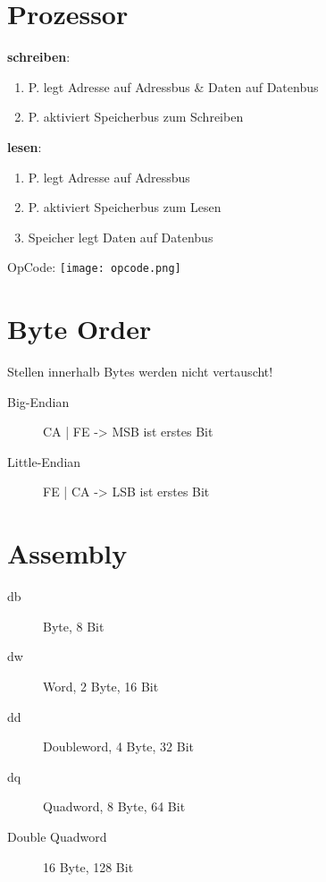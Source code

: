 

\newcommand{\TITLE}{Betriebssysteme 1}
\newcommand{\AUTHOR}{Mona Panchaud}
\newcommand{\INSTITUTE}{Ostschweizer Fachhochschule}

\begin{multicols*}{4}

\section{Prozessor}
\textbf{schreiben}:
\begin{enumerate}
    \item P. legt Adresse auf Adressbus \& Daten auf Datenbus
    \item P. aktiviert Speicherbus zum Schreiben
\end{enumerate}
\textbf{lesen}:
\begin{enumerate}
    \item P. legt Adresse auf Adressbus
    \item P. aktiviert Speicherbus zum Lesen
    \item Speicher legt Daten auf Datenbus
\end{enumerate}
OpCode: \texttt{[image: opcode.png]}

\section{Byte Order}
Stellen innerhalb Bytes werden nicht vertauscht!
\begin{description}
    \item[Big-Endian] CA | FE -> MSB ist erstes Bit
    \item[Little-Endian] FE | CA -> LSB ist erstes Bit
\end{description}

\section{Assembly}
\begin{description}
    \item[db] Byte, 8 Bit
    \item[dw] Word, 2 Byte, 16 Bit
    \item[dd] Doubleword, 4 Byte, 32 Bit
    \item[dq] Quadword, 8 Byte, 64 Bit
    \item [Double Quadword] 16 Byte, 128 Bit
\end{description}


\end{multicols*}
